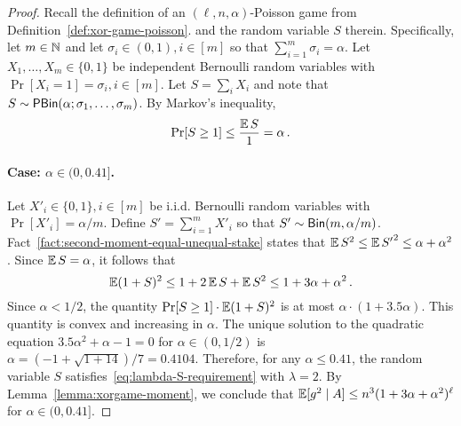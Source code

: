   \begin{proof}
    Recall the definition of an $(\ell, n, \alpha)$-Poisson game from Definition~\ref{def:xor-game-poisson}.
    and 
    the random variable $S$ therein.
    Specifically, let $m \in \mathbb{N}$ and 
    let $\sigma_i \in (0, 1), i \in [m]$ so that $\sum_{i=1}^m \sigma_i = \alpha$.
    Let $X_1, \ldots, X_m \in \{0,1\}$ be independent Bernoulli random variables with 
    $\Pr[X_i = 1] = \sigma_i, i \in [m]$. 
    Let $S = \sum_i X_i$ 
    and note that $S \sim \mathsf{PBin}(\alpha; \sigma_1, \ldots, \sigma_m)$.
    By Markov's inequality,
    $$
        \Pr[S \geq 1] \leq \frac{\operatorname{\mathbb{E}} S}{1} = \alpha \,.
    $$

    \paragraph{Case: $\alpha \in (0, 0.41]$.}
    Let $X'_i \in \{0,1\}, i \in [m]$ be i.i.d. Bernoulli random variables 
    with $\Pr[X'_i] = \alpha/m$. 
    Define $S' = \sum_{i=1}^m X'_i$ 
    so that $S'\sim \mathsf{Bin}(m, \alpha/m)$. 
    Fact~\ref{fact:second-moment-equal-unequal-stake} states that 
    $\operatorname{\mathbb{E}} S^2 \leq \operatorname{\mathbb{E}} {S'}^2 \leq \alpha + \alpha^2$. 
    Since $\operatorname{\mathbb{E}} S = \alpha$, it follows that 
    $$
    \operatorname{\mathbb{E}} (1 + S)^2 
    \leq 1 + 2 \operatorname{\mathbb{E}} S + \operatorname{\mathbb{E}} S^2
    \leq 1 + 3 \alpha + \alpha^2
    \,.
    $$
    Since $\alpha < 1/2$, the quantity 
    $\Pr[S \geq 1] \cdot \operatorname{\mathbb{E}} (1 + S)^2$ is at most $\alpha\cdot (1 + 3.5 \alpha)$. 
    This quantity is convex and increasing in $\alpha$. 
    The unique solution to the quadratic equation $3.5 \alpha^2 + \alpha - 1 = 0$ 
    for $\alpha \in (0, 1/2)$ 
    is $\alpha = (-1 + \sqrt{1 + 14})/7 = 0.4104$. 
    Therefore, for any $\alpha \leq 0.41$, 
    the random variable $S$ satisfies~\eqref{eq:lambda-S-requirement} 
    with $\lambda = 2$.
    By Lemma~\ref{lemma:xorgame-moment}, we conclude that 
    $\operatorname{\mathbb{E}}[g^2 \mid A] \leq n^3 (1 + 3 \alpha + \alpha^2)^\ell$ 
    for $\alpha \in (0, 0.41]$.
    

\end{proof}
